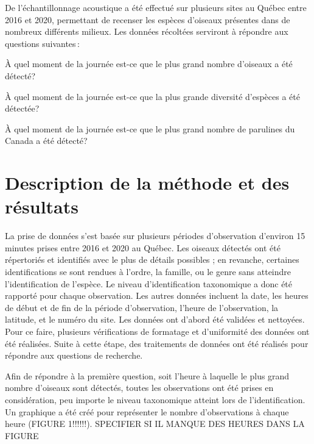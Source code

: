 \documentclass[9pt,twocolumn,twoside,]{pnas-new}
\begin{document}
De l'échantillonnage acoustique a été effectué sur plusieurs sites au
Québec entre 2016 et 2020, permettant de recenser les espèces d'oiseaux
présentes dans de nombreux différents milieux. Les données récoltées
serviront à répondre aux questions suivantes\,:

À quel moment de la journée est-ce que le plus grand nombre d'oiseaux a
été détecté?

À quel moment de la journée est-ce que la plus grande diversité
d'espèces a été détectée?

À quel moment de la journée est-ce que le plus grand nombre de parulines
du Canada a été détecté?

\hypertarget{description-de-la-muxe9thode-et-des-ruxe9sultats}{%
\section*{Description de la méthode et des
résultats}\label{description-de-la-muxe9thode-et-des-ruxe9sultats}}

La prise de données s'est basée sur plusieurs périodes d'observation
d'environ 15 minutes prises entre 2016 et 2020 au Québec. Les oiseaux
détectés ont été répertoriés et identifiés avec le plus de détails
possibles ; en revanche, certaines identifications se sont rendues à
l'ordre, la famille, ou le genre sans atteindre l'identification de
l'espèce. Le niveau d'identification taxonomique a donc été rapporté
pour chaque observation. Les autres données incluent la date, les heures
de début et de fin de la période d'observation, l'heure de
l'observation, la latitude, et le numéro du site. Les données ont
d'abord été validées et nettoyées. Pour ce faire, plusieurs
vérifications de formatage et d'uniformité des données ont été
réalisées. Suite à cette étape, des traitements de données ont été
réalisés pour répondre aux questions de recherche.

Afin de répondre à la première question, soit l'heure à laquelle le plus
grand nombre d'oiseaux sont détectés, toutes les observations ont été
prises en considération, peu importe le niveau taxonomique atteint lors
de l'identification. Un graphique a été créé pour représenter le nombre
d'observations à chaque heure (FIGURE 1!!!!!!). SPECIFIER SI IL MANQUE
DES HEURES DANS LA FIGURE
\end{document}
